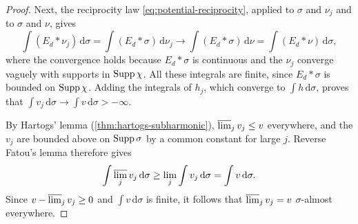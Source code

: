 \begin{proof}
Next, the reciprocity law \eqref{eq:potential-reciprocity}, applied to $\sigma$ and $\nu_j$ and to $\sigma$ and $\nu$, gives
\[
 \int(E_d*\nu_j)\,\mathrm d\sigma=\int(E_d*\sigma)\,\mathrm d\nu_j
 \longrightarrow\int(E_d*\sigma)\,\mathrm d\nu=\int(E_d*\nu)\,\mathrm d\sigma,
\]
where the convergence holds because $E_d*\sigma$ is continuous and the $\nu_j$ converge vaguely with supports in $\operatorname{Supp}\chi$. All these integrals are finite, since $E_d*\sigma$ is bounded on $\operatorname{Supp}\chi$. Adding the integrals of $h_j$, which converge to $\int h\,\mathrm d\sigma$, proves that $\int v_j\,\mathrm d\sigma\to\int v\,\mathrm d\sigma>-\infty$.

By Hartogs' lemma (\cref{thm:hartogs-subharmonic}), $\varlimsup_jv_j\leq v$ everywhere, and the $v_j$ are bounded above on $\operatorname{Supp}\sigma$ by a common constant for large $j$. Reverse Fatou's lemma therefore gives
\[
 \int\varlimsup_jv_j\,\mathrm d\sigma\geq\lim_j\int v_j\,\mathrm d\sigma=\int v\,\mathrm d\sigma.
\]
Since $v-\varlimsup_jv_j\geq0$ and $\int v\,\mathrm d\sigma$ is finite, it follows that $\varlimsup_jv_j=v$ $\sigma$-almost everywhere.
\end{proof}

